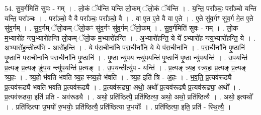 \documentclass[17pt]{extarticle}
\begin{document}
54. सु॒व॒र्गमिति॑ सुवः - गम् । . लो॒कं ॅय॑न्ति यन्ति लो॒कम् ॅलो॒कं ॅय॑न्ति । . य॒न्ति॒ परा᳚ञ्चः॒ परा᳚ञ्चो यन्ति यन्ति॒ परा᳚ञ्चः । . परा᳚ञ्चो॒ वै वै परा᳚ञ्चः॒ परा᳚ञ्चो॒ वै । . वा ए॒त ए॒ते वै वा ए॒ते । . ए॒ते सु॑व॒र्गꣳ सु॑व॒र्ग मे॒त ए॒ते सु॑व॒र्गम् । . सु॒व॒र्गम् ॅलो॒कम् ॅलो॒कꣳ सु॑व॒र्गꣳ सु॑व॒र्गम् ॅलो॒कम् । . सु॒व॒र्गमिति॑ सुवः - गम् । . लो॒क म॒भ्यारो॑ह न्त्य॒भ्यारो॑हन्ति लो॒कम् ॅलो॒क म॒भ्यारो॑हन्ति । . अ॒भ्यारो॑हन्ति॒ ये ये᳚ ऽभ्यारो॑ह न्त्य॒भ्यारो॑हन्ति॒ ये । . अ॒भ्यारो॑ह॒न्तीत्य॑भि - आरो॑हन्ति । . ये प॑रा॒चीना॑नि परा॒चीना॑नि॒ ये ये प॑रा॒चीना॑नि । . प॒रा॒चीना॑नि पृ॒ष्ठानि॑ पृ॒ष्ठानि॑ परा॒चीना॑नि परा॒चीना॑नि पृ॒ष्ठानि॑ । . पृ॒ष्ठा न्यु॑प॒य न्त्यु॑प॒यन्ति॑ पृ॒ष्ठानि॑ पृ॒ष्ठा न्यु॑प॒यन्ति॑ । . उ॒प॒यन्ति॑ प्र॒त्यङ् प्र॒त्यङ् ङु॑प॒य न्त्यु॑प॒यन्ति॑ प्र॒त्यङ् । . उ॒प॒यन्तीत्यु॑प - यन्ति॑ । . प्र॒त्यङ् त्र्य॒ह स्त्र्य॒हः प्र॒त्यङ् प्र॒त्यङ् त्र्य॒हः । . त्र्य॒हो भ॑वति भवति त्र्य॒ह स्त्र्य॒हो भ॑वति । . त्र्य॒ह इति॑ त्रि - अ॒हः । . भ॒व॒ति॒ प्र॒त्यव॑रूढ्यै प्र॒त्यव॑रूढ्यै भवति भवति प्र॒त्यव॑रूढ्यै । . प्र॒त्यव॑रूढ्या॒ अथो॒ अथो᳚ प्र॒त्यव॑रूढ्यै प्र॒त्यव॑रूढ्या॒ अथो᳚ । . प्र॒त्यव॑रूढ्या॒ इति॑ प्रति - अव॑रूढ्यै । . अथो॒ प्रति॑ष्ठित्यै॒ प्रति॑ष्ठित्या॒ अथो॒ अथो॒ प्रति॑ष्ठित्यै । . अथो॒ इत्यथो᳚ । . प्रति॑ष्ठित्या उ॒भयो॑ रु॒भयोः॒ प्रति॑ष्ठित्यै॒ प्रति॑ष्ठित्या उ॒भयोः᳚ । . प्रति॑ष्ठित्या॒ इति॒ प्रति॑ - स्थि॒त्यै॒ । \newline
\end{document}
